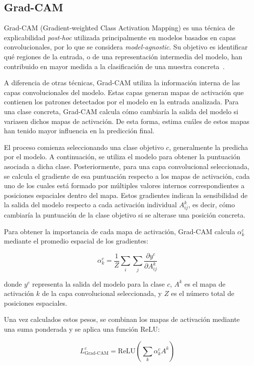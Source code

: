 \subsection{Grad-CAM}
\label{subsubsec:eda_gradcam}
Grad-CAM (Gradient-weighted Class Activation Mapping) es una técnica de explicabilidad \textit{post-hoc} utilizada principalmente en modelos basados en capas convolucionales, por lo que se considera \textit{model-agnostic}. Su objetivo es identificar qué regiones de la entrada, o de una representación intermedia del modelo, han contribuido en mayor medida a la clasificación de una muestra concreta~\parencite{2017gradcam}.

A diferencia de otras técnicas, Grad-CAM utiliza la información interna de las capas convolucionales del modelo. Estas capas generan mapas de activación que contienen los patrones detectados por el modelo en la entrada analizada. Para una clase concreta, Grad-CAM calcula cómo cambiaría la salida del modelo si variasen dichos mapas de activación. De esta forma, estima cuáles de estos mapas han tenido mayor influencia en la predicción final.

El proceso comienza seleccionando una clase objetivo $c$, generalmente la predicha por el modelo. A continuación, se utiliza el modelo para obtener la puntuación asociada a dicha clase. Posteriormente, para una capa convolucional seleccionada, se calcula el gradiente de esa puntuación respecto a los mapas de activación, cada uno de los cuales está formado por múltiples valores internos correspondientes a posiciones espaciales dentro del mapa. Estos gradientes indican la sensibilidad de la salida del modelo respecto a cada activación individual $A_{ij}^k$, es decir, cómo cambiaría la puntuación de la clase objetivo si se alterase una posición concreta.

Para obtener la importancia de cada mapa de activación, Grad-CAM calcula $\alpha_k^c$ mediante el promedio espacial de los gradientes:

$$\alpha_k^c = \frac{1}{Z} \sum_i \sum_j \frac{\partial y^c}{\partial A_{ij}^k}$$

donde $y^c$ representa la salida del modelo para la clase $c$, $A^k$ es el mapa de activación $k$ de la capa convolucional seleccionada, y $Z$ es el número total de posiciones espaciales.

Una vez calculados estos pesos, se combinan los mapas de activación mediante una suma ponderada y se aplica una función ReLU:

$$L_{\text{Grad-CAM}}^c = \text{ReLU}\left(\sum_k \alpha_k^c A^k\right)$$

